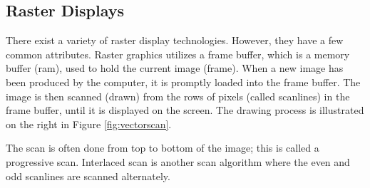 \subsection{Raster Displays}
There exist a variety of raster display technologies.
However, they have a few common attributes.
Raster graphics utilizes a frame buffer, which is a memory buffer (\gls{ram}), used to hold the current image (frame).
When a new image has been produced by the computer, it is promptly loaded into the frame buffer.
The image is then scanned (drawn) from the rows of pixels (called scanlines) in the frame buffer, until it is displayed on the screen.
The drawing process is illustrated on the right in Figure \ref{fig:vectorscan}.

The scan is often done from top to bottom of the image; this is called a progressive scan.
Interlaced scan is another scan algorithm where the even and odd scanlines are scanned alternately.
